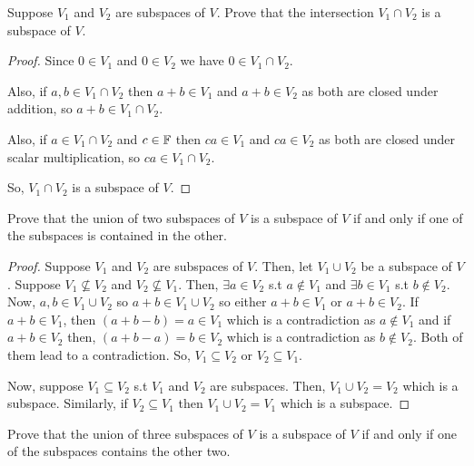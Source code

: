 \begin{exercise}
Suppose $V_1$ and $V_2$ are subspaces of $V$. Prove that the intersection $V_1 \cap V_2$ is a subspace of $V$.
\end{exercise}

\begin{proof}
Since $0 \in V_1$ and $0 \in V_2$ we have $0 \in V_1 \cap V_2$.

Also, if $a, b \in V_1 \cap V_2$ then $a+b \in V_1$ and $a+b \in V_2$ as both are closed under addition, so $a+b \in V_1 \cap V_2$.

Also, if $a \in V_1 \cap V_2$ and $c \in \mathbb{F}$ then $ca \in V_1$ and $ca \in V_2$ as both are closed under scalar multiplication, so $ca \in V_1 \cap V_2$.

So, $V_1 \cap V_2$ is a subspace of $V$.
\end{proof}


\begin{exercise}
\label{exp:1.11}
Prove that the union of two subspaces of $V$ is a subspace of $V$ if and only if one of the subspaces is contained in the other.
\end{exercise}

\begin{proof}
Suppose $V_1$ and $V_2$ are subspaces of $V$. Then, let $V_1 \cup V_2$ be a subspace of $V$. Suppose $V_1 \not\subseteq V_2$ and $V_2 \not\subseteq V_1$. Then, $\exists a \in V_2$ s.t $a \notin V_1$ and $\exists b \in V_1$ s.t $b \notin V_2$. Now, $a, b \in V_1 \cup V_2$ so $a + b \in V_1 \cup V_2$ so either $a+b \in V_1$ or $a+b \in V_2$. If $a+b \in V_1$, then $(a+b-b) = a \in V_1$ which is a contradiction as $a \notin V_1$ and if $a+b \in V_2$ then, $(a+b-a) = b \in V_2$ which is a contradiction as $b \notin V_2$. Both of them lead to a contradiction. So, $V_1 \subseteq V_2$ or $V_2 \subseteq V_1$.

Now, suppose $V_1 \subseteq V_2$ s.t $V_1$ and $V_2$ are subspaces. Then, $V_1 \cup V_2 = V_2$ which is a subspace. Similarly, if $V_2 \subseteq V_1$ then $V_1 \cup V_2 = V_1$ which is a subspace.
\end{proof}

\begin{exercise}
Prove that the union of three subspaces of $V$ is a subspace of $V$ if and only if one of the subspaces contains the other two.
\end{exercise}

